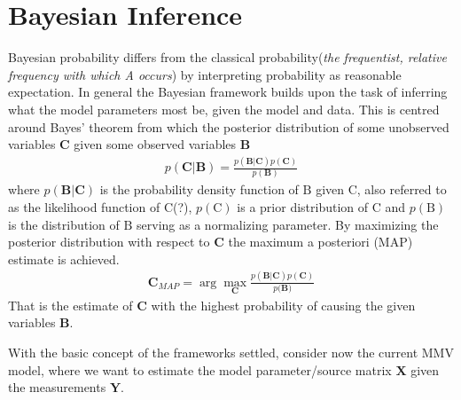 \section{Bayesian Inference}
Bayesian probability differs from the classical probability(\textit{the frequentist, relative
frequency with which A occurs}) by interpreting probability as reasonable expectation. 
In general the Bayesian framework builds upon the task of inferring what the model parameters most be, given the model and data.  
This is centred around Bayes' theorem from which the posterior distribution of some unobserved variables $\textbf{C}$ given some observed variables $\textbf{B}$
\begin{align*}
p(\textbf{C}|\textbf{B})=\frac{p(\textbf{B}|\textbf{C})p(\textbf{C})}{p(\textbf{B})}
\end{align*}  
where $p(\textbf{B}|\textbf{C})$ is the probability density function of $\text{B}$ given $\text{C}$, also referred to as the likelihood function of $\text{C}$(?), $p(\text{C})$ is a prior distribution of $\text{C}$ and $p(\text{B})$ is the distribution of $\text{B}$ serving as a normalizing parameter.  
By maximizing the posterior distribution with respect to $\textbf{C}$ the maximum a posteriori (MAP) estimate is achieved. 
\begin{align*}
\textbf{C}_{MAP} = \arg \max_{\mathbf{C}} \frac{p(\mathbf{B} \vert \mathbf{C}) p(\mathbf{C})}{p(\mathbf{B)}}
\end{align*}
That is the estimate of $\textbf{C}$ with the highest probability of causing the given variables $\textbf{B}$. 

With the basic concept of the frameworks settled, consider now the current MMV model, where we want to estimate the model parameter/source matrix $\textbf{X}$ given the measurements $\textbf{Y}$.   
  

